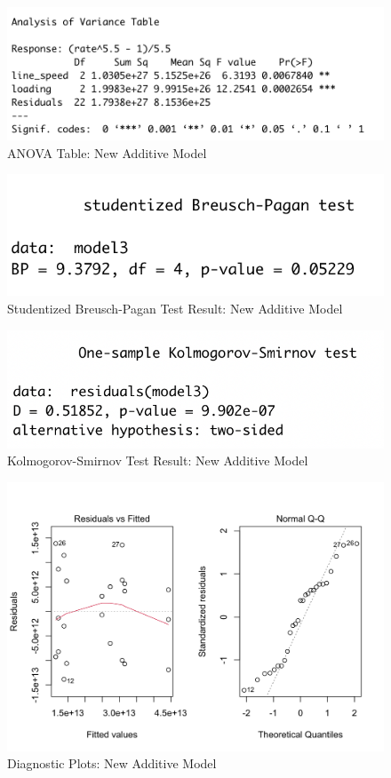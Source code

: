 \documentclass[11pt,a4paper]{article}
\begin{document}
\begin{figure}[htb]
    \centering
    \includegraphics[scale=0.8]{add2.png}
    \caption{ANOVA Table: New Additive Model}
    \label{}
\end{figure}

\begin{figure}[htb]
    \centering
    \includegraphics[scale=1]{BP2}
    \caption{Studentized Breusch-Pagan Test Result: New Additive Model}
    \label{}
\end{figure}
\begin{figure}[htb]
    \centering
    \includegraphics[scale=1]{KS2}
    \caption{Kolmogorov-Smirnov Test Result: New Additive Model}
    \label{}
\end{figure}
\begin{figure}[htb]
    \centering
    \includegraphics[scale=0.3]{DP2}
    \caption{Diagnostic Plots: New Additive Model}
    \label{}
\end{figure}
\end{document}
